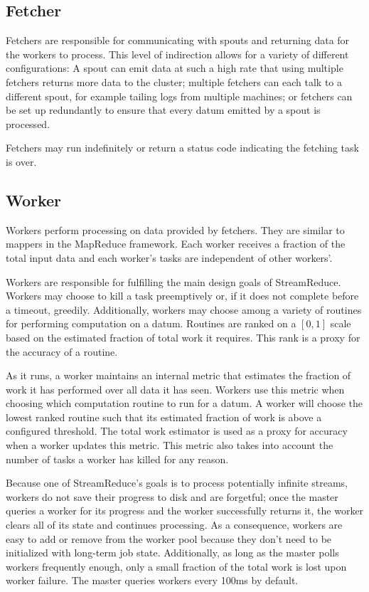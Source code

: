 \documentclass[12pt,twocolumn]{article}
\begin{document}
\subsection{Fetcher}
Fetchers are responsible for communicating with spouts and returning data for the
workers to process. This level of indirection allows for a variety of different
configurations: A spout can emit data at such a high rate that using multiple fetchers
returns more data to the cluster; multiple fetchers can each talk to a different spout,
for example tailing logs from multiple machines; or fetchers can be set up redundantly
to ensure that every datum emitted by a spout is processed.

Fetchers may run indefinitely or return a status code indicating
the fetching task is over.
\subsection{Worker}
Workers perform processing on data provided by fetchers. They are similar to mappers
in the MapReduce framework. Each worker receives a fraction of the total input data
and each worker's tasks are independent of other workers'.

Workers are responsible for fulfilling the main design goals of StreamReduce. Workers may
choose
to kill a task preemptively or, if it does not complete before a timeout, greedily. Additionally,
workers may choose among a variety of routines for performing computation on a datum.
Routines are ranked on a $[0,1]$ scale based on the estimated fraction of total work it
requires. This rank is a proxy for the accuracy of a routine.

As it runs, a worker maintains an internal metric that estimates the fraction of work
it has performed over all data it has seen. Workers use this metric when choosing which
computation routine to run for a datum. A worker will choose the lowest ranked routine
such that its estimated fraction of work is above a configured threshold.
The total work estimator is used as a proxy for accuracy when a worker updates
this metric. This metric also takes into account the number of tasks a worker has killed
for any reason.

Because one of StreamReduce's goals is to process potentially infinite streams, workers do
not
save their progress to disk and are forgetful; once the master queries a worker for its
progress and the worker successfully returns it, the worker clears all of its state and
continues processing. As a consequence, workers are easy to add or remove from the worker
pool because they don't need to be initialized with long-term job state. Additionally, as
long as the master polls workers frequently enough, only a small
fraction of the total work is lost upon worker failure.
The master queries workers every 100ms by default.
\end{document}
